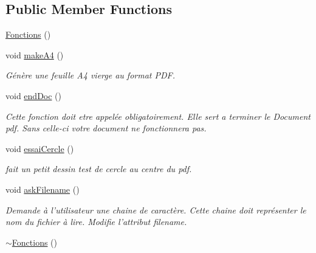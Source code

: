 \subsection*{Public Member Functions}
\begin{DoxyCompactItemize}
\item 
\hyperlink{classFonctions_a3def9621d78c611beb962e4a73829e8f}{Fonctions} ()
\item 
void \hyperlink{classFonctions_a5539501c7d6cb67f829e8f578197e23f}{make\+A4} ()
\begin{DoxyCompactList}\small\item\em Génère une feuille A4 vierge au format P\+D\+F. \end{DoxyCompactList}\item 
void \hyperlink{classFonctions_a56328671ad685e595b7d0c1a4d7ff233}{end\+Doc} ()
\begin{DoxyCompactList}\small\item\em Cette fonction doit etre appelée obligatoirement. Elle sert a terminer le Document pdf. Sans celle-\/ci votre document ne fonctionnera pas. \end{DoxyCompactList}\item 
void \hyperlink{classFonctions_aa8d950f493acc58fd3e48730559b4ac5}{essai\+Cercle} ()
\begin{DoxyCompactList}\small\item\em fait un petit dessin test de cercle au centre du pdf. \end{DoxyCompactList}\item 
void \hyperlink{classFonctions_ad4e849db3ce1595c7a8bb2eb746b09d5}{ask\+Filename} ()
\begin{DoxyCompactList}\small\item\em Demande à l'utilisateur une chaine de caractère. Cette chaine doit représenter le nom du fichier à lire. Modifie l'attribut filename. \end{DoxyCompactList}\item 
\hyperlink{classFonctions_a6d7062796a65e0e15f3b3aa3cfacd08f}{$\sim$\+Fonctions} ()
\end{DoxyCompactItemize}
